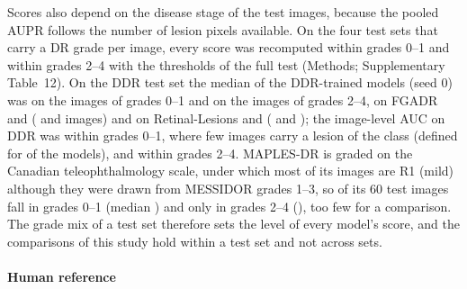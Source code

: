 Scores also depend on the disease stage of the test images, because the pooled AUPR follows the number of lesion pixels available. On the four test sets that carry a DR grade per image, every score was recomputed within grades 0--1 and within grades 2--4 with the thresholds of the full test (Methods; Supplementary Table~12). On the DDR test set the median \mAUPR{} of the DDR-trained models (seed 0) was  on the  images of grades 0--1 and  on the  images of grades 2--4, on FGADR  and  ( and  images) and on Retinal-Lesions  and  ( and ); the image-level AUC on DDR was  within grades 0--1, where few images carry a lesion of the class (defined for  of the  models), and  within grades 2--4. MAPLES-DR is graded on the Canadian teleophthalmology scale, under which most of its images are R1 (mild) although they were drawn from MESSIDOR grades 1--3, so  of its 60 test images fall in grades 0--1 (median ) and only  in grades 2--4 (), too few for a comparison. The grade mix of a test set therefore sets the level of every model's score, and the comparisons of this study hold within a test set and not across sets.

\paragraph{Human reference}

